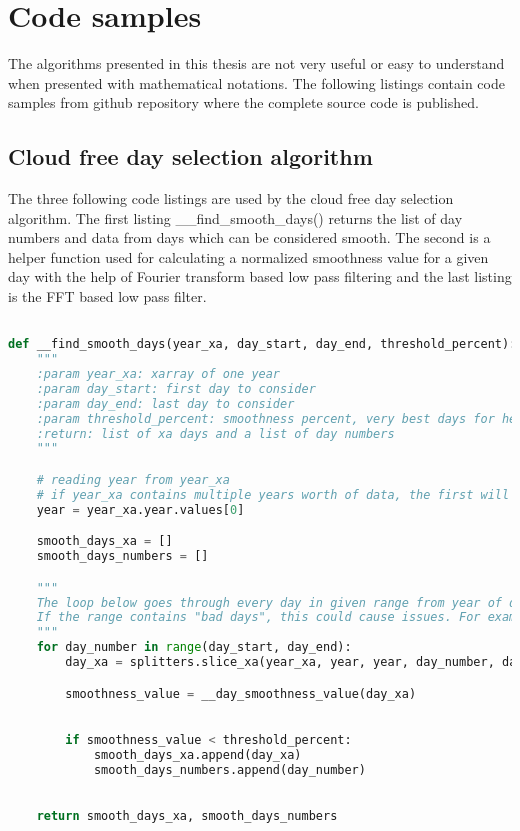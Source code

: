\appendix
\section{Code samples}
The algorithms presented in this thesis are not very useful or easy to understand when presented with mathematical notations. The following listings contain code samples from github repository \cite{github_source} where the complete source code is published. 

\subsection{Cloud free day selection algorithm} \label{cloudfree_code}

The three following code listings are used by the cloud free day selection algorithm. The first listing \_\_find\_smooth\_days() returns the list of day numbers and data from days which can be considered smooth. The second is a helper function used for calculating a normalized smoothness value for a given day with the help of Fourier transform based low pass filtering and the last listing is the FFT based low pass filter.

\begin{lstlisting}[language=Python, caption={Cloud free day finder main function}]

def __find_smooth_days(year_xa, day_start, day_end, threshold_percent):
    """
    :param year_xa: xarray of one year
    :param day_start: first day to consider
    :param day_end: last day to consider
    :param threshold_percent: smoothness percent, very best days for helsinki dataset have a smoothness value lower than 0.4. 1 seems to result in good values
    :return: list of xa days and a list of day numbers
    """

    # reading year from year_xa
    # if year_xa contains multiple years worth of data, the first will be chosen. Will most likely result in errors
    year = year_xa.year.values[0]

    smooth_days_xa = []
    smooth_days_numbers = []

    """
    The loop below goes through every day in given range from year of data
    If the range contains "bad days", this could cause issues. For example a day with zero power for every minute would be perfectly smooth, but at the same time it's the opposite of what we want
    """
    for day_number in range(day_start, day_end):
        day_xa = splitters.slice_xa(year_xa, year, year, day_number, day_number)

        smoothness_value = __day_smoothness_value(day_xa)

        
        if smoothness_value < threshold_percent:
            smooth_days_xa.append(day_xa)
            smooth_days_numbers.append(day_number)
        

    return smooth_days_xa, smooth_days_numbers
\end{lstlisting}

